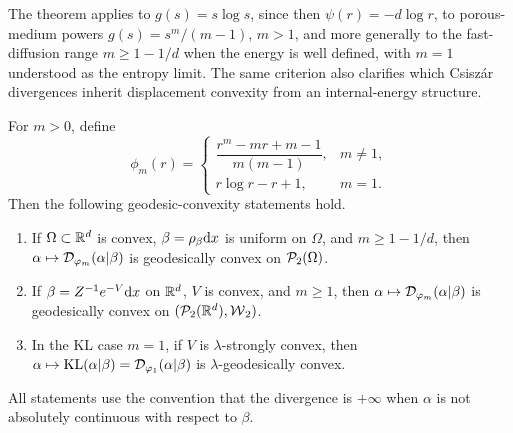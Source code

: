 The theorem applies to \(g(s)=s\log s\), since then \(\psi(r)=-d\log r\), to porous-medium powers \(g(s)=s^m/(m-1)\), \(m>1\), and more generally to the fast-diffusion range \(m\geq1-1/d\) when the energy is well defined, with \(m=1\) understood as the entropy limit.
The same criterion also clarifies which Csisz\'ar divergences inherit displacement convexity from an internal-energy structure.
\begin{prop}\label{prop-power-divergences-geodesic-convexity}\label{prop-kl-gibbs-geodesic-convexity}
	For \(m>0\), define
	\[
		\phi_m(r)=
		\begin{cases}
			\dfrac{r^m-mr+m-1}{m(m-1)}, & m\neq1,\\[2mm]
			r\log r-r+1, & m=1.
		\end{cases}
	\]
	Then the following geodesic-convexity statements hold.
	\begin{enumerate}
	\item If \(\Omega\subset\mathbb{R}^d\) is convex, \(\beta=\rho_{\beta}\mathrm{d} x\) is uniform on \(\Omega\), and \(m\geq1-1/d\), then \(\alpha\mapsto\mathcal{D}_{\varphi_m}(\alpha|\beta)\) is geodesically convex on \(\mathcal{P}_2(\Omega)\).
		\item If \(\beta=Z^{-1}e^{-V}\mathrm{d} x\) on \(\mathbb{R}^d\), \(V\) is convex, and \(m\geq1\), then \(\alpha\mapsto\mathcal{D}_{\varphi_m}(\alpha|\beta)\) is geodesically convex on \((\mathcal{P}_2(\mathbb{R}^d),\operatorname{\mathcal{W}}_2)\).
		\item In the KL case \(m=1\), if \(V\) is \(\lambda\)-strongly convex, then \(\alpha\mapsto\operatorname{KL}(\alpha|\beta)=\mathcal{D}_{\varphi_1}(\alpha|\beta)\) is \(\lambda\)-geodesically convex.
	\end{enumerate}
	All statements use the convention that the divergence is \(+\infty\) when \(\alpha\) is not absolutely continuous with respect to \(\beta\).
\end{prop}
